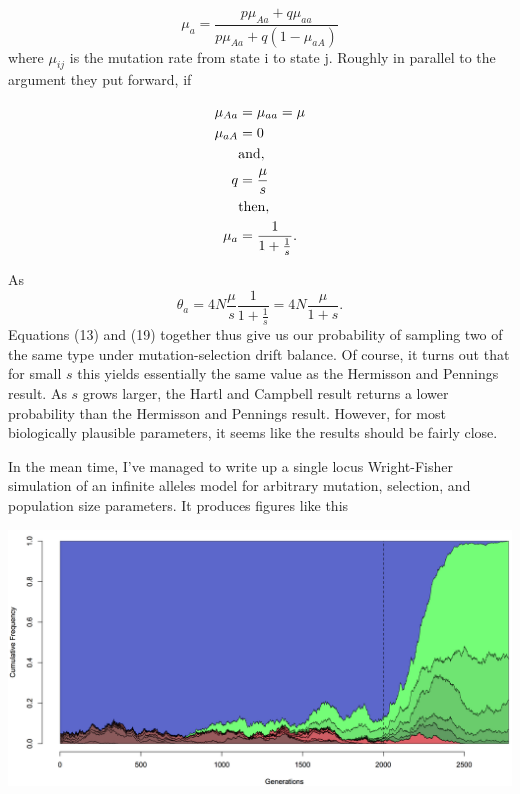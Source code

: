 \documentclass[reqno]{amsart}
\begin{document}
\begin{equation}
	\mu_a = \frac{p\mu_{Aa} + q\mu_{aa}}{p\mu_{Aa} + q(1-\mu_{aA})}
\end{equation}
where $\mu_{ij}$ is the mutation rate from state i to state j. Roughly in parallel to the argument they put forward, if

\begin{align}
	\mu_{Aa}&=\mu_{aa}=\mu \\
	\mu_{aA} &= 0 \\ 
	&\text{and}, \notag\\
	q &= \frac{\mu}{s} \\
	&\text{then}, \notag\\
	\mu_a& = \frac{1}{1+\frac{1}{s}}	.
\end{align}

As 
\begin{equation}
	\theta_a = 4N\frac{\mu}{s}\frac{1}{1+\frac{1}{s}} = 4N\frac{\mu}{1+s}.
\end{equation}
Equations (13) and (19) together thus give us our probability of sampling two of the same type under mutation-selection drift balance. Of course, it turns out that for small $s$ this yields essentially the same value as the Hermisson and Pennings result\cite{Hermisson2005}. As $s$ grows larger, the Hartl and Campbell result returns a lower probability than the Hermisson and Pennings result. However, for most biologically plausible parameters, it seems like the results should be fairly close.

In the mean time, I've managed to write up a single locus Wright-Fisher simulation of an infinite alleles model for arbitrary mutation, selection, and population size parameters. It produces figures like this


\begin{flushleft}
	\includegraphics[width = \textwidth]{LSFigure1}
\end{flushleft}
\end{document}
